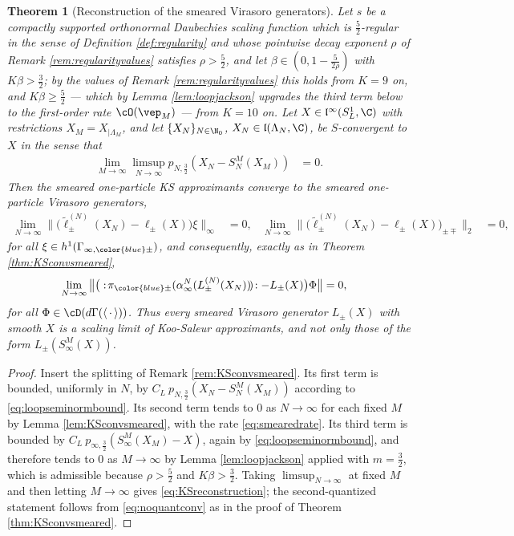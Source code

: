 \documentclass[a4paper, 11pt]{article}
\newcommand{\fl}{\mathfrak{l}}\newcommand{\cl}{\mathcal{l}}
\DeclareMathOperator{\1}{\mathds{1}}
\newtheorem{thm}{Theorem} [section]
\begin{document}
\begin{thm}[Reconstruction of the smeared Virasoro generators]
\label{thm:KSreconstruction}
Let $s$ be a compactly supported orthonormal Daubechies scaling function which is $\tfrac{5}{2}$-regular in the sense of Definition \ref{def:regularity} and whose pointwise decay exponent $\rho$ of Remark \ref{rem:regularityvalues} satisfies $\rho>\tfrac{5}{2}$, and let $\beta\in(0,1-\tfrac{5}{2\rho})$ with $K\beta>\tfrac{3}{2}$; by the values of Remark \ref{rem:regularityvalues} this holds from $K=9$ on, and $K\beta\geq\tfrac{5}{2}$ --- which by Lemma \ref{lem:loopjackson} upgrades the third term below to the first-order rate $\cO(\vep_{M})$ --- from $K=10$ on. Let $X\in\fl^{\infty}(S^{1}_{L},\C)$ with restrictions $X_{M} = X_{|\Lambda_{M}}$, and let $\{X_{N}\}_{N\in\N_{0}}$, $X_{N}\in\fl(\Lambda_{N},\C)$, be $S$-convergent to $X$ in the sense that
\begin{align}
\label{eq:Sconvloops}
\lim_{M\rightarrow\infty}\limsup_{N\rightarrow\infty}p_{N,\frac{3}{2}}(X_{N}-S^{M}_{N}(X_{M})) & = 0.
\end{align}
Then the smeared one-particle KS approximants converge to the smeared one-particle Virasoro generators,
\begin{align}
\label{eq:KSreconstruction}
\lim_{N\rightarrow\infty}\big\|\big(\tilde{\ell}^{(N)}_{\pm}(X_{N})-\ell_{\pm}(X)\big)\xi\big\|_{\infty} & = 0, & \lim_{N\rightarrow\infty}\big\|\big(\tilde{\ell}^{(N)}_{\pm}(X_{N})-\ell_{\pm}(X)\big)_{\pm\mp}\big\|_{2} & = 0,
\end{align}
for all $\xi\in h^{1}(\Gamma_{\infty,{\color{blue}\pm}})$, and consequently, exactly as in Theorem \ref{thm:KSconvsmeared},
\begin{align*}
\lim_{N\rightarrow\infty}\big\|\big(:\!\pi_{{\color{blue}\pm}}(\alpha^{N}_{\infty}(L^{(N)}_{\pm}(X_{N}))\!)\!:-L_{\pm}(X)\big)\Phi\big\| & = 0,
\end{align*}
for all $\Phi\in\cD(d\Gamma(\langle\!\ \cdot\!\ \rangle))$. Thus every smeared Virasoro generator $L_{\pm}(X)$ with smooth $X$ is a scaling limit of Koo-Saleur approximants, and not only those of the form $L_{\pm}(S^{M}_{\infty}(X))$.
\end{thm}
\begin{proof}
Insert the splitting of Remark \ref{rem:KSconvsmeared}. Its first term is bounded, uniformly in $N$, by $C_{L}\!\ p_{N,\frac{3}{2}}(X_{N}-S^{M}_{N}(X_{M}))$ according to \eqref{eq:loopseminormbound}. Its second term tends to $0$ as $N\rightarrow\infty$ for each fixed $M$ by Lemma \ref{lem:KSconvsmeared}, with the rate \eqref{eq:smearedrate}. Its third term is bounded by $C_{L}\!\ p_{\infty,\frac{3}{2}}(S^{M}_{\infty}(X_{M})-X)$, again by \eqref{eq:loopseminormbound}, and therefore tends to $0$ as $M\rightarrow\infty$ by Lemma \ref{lem:loopjackson} applied with $m=\tfrac{3}{2}$, which is admissible because $\rho>\tfrac{5}{2}$ and $K\beta>\tfrac{3}{2}$. Taking $\limsup_{N\rightarrow\infty}$ at fixed $M$ and then letting $M\rightarrow\infty$ gives \eqref{eq:KSreconstruction}; the second-quantized statement follows from \eqref{eq:noquantconv} as in the proof of Theorem \ref{thm:KSconvsmeared}.
\end{proof}
\end{document}
